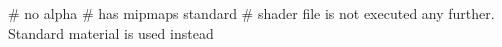 # no alpha
# has mipmaps
standard     # shader file is not executed any further. Standard material is used instead

